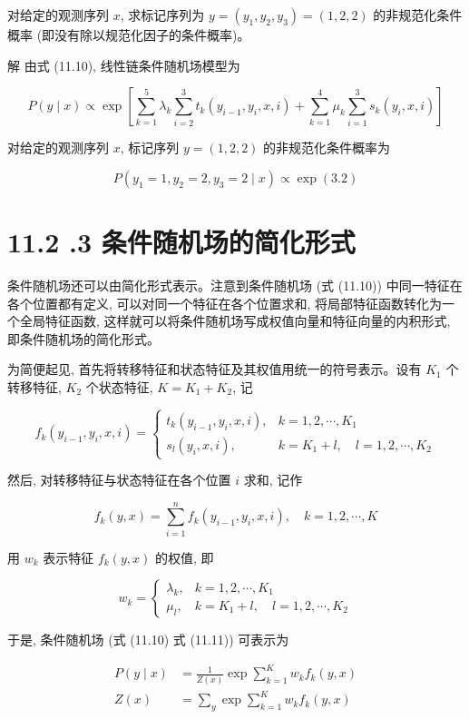 \documentclass[10pt]{article}
\begin{document}
\begin{CJK*}{UTF8}{bsmi}
对给定的观测序列 $x$, 求标记序列为 $y=\left(y_{1}, y_{2}, y_{3}\right)=(1,2,2)$ 的非规范化条件概率 (即没有除以规范化因子的条件概率)。

解 由式 (11.10), 线性链条件随机场模型为

$$
P(y \mid x) \propto \exp \left[\sum_{k=1}^{5} \lambda_{k} \sum_{i=2}^{3} t_{k}\left(y_{i-1}, y_{i}, x, i\right)+\sum_{k=1}^{4} \mu_{k} \sum_{i=1}^{3} s_{k}\left(y_{i}, x, i\right)\right]
$$

对给定的观测序列 $x$, 标记序列 $y=(1,2,2)$ 的非规范化条件概率为

$$
P\left(y_{1}=1, y_{2}=2, y_{3}=2 \mid x\right) \propto \exp (3.2)
$$

\section*{11.2 .3 条件随机场的简化形式}
条件随机场还可以由简化形式表示。注意到条件随机场 (式 (11.10)) 中同一特征在各个位置都有定义, 可以对同一个特征在各个位置求和, 将局部特征函数转化为一个全局特征函数, 这样就可以将条件随机场写成权值向量和特征向量的内积形式, 即条件随机场的简化形式。

为简便起见, 首先将转移特征和状态特征及其权值用统一的符号表示。设有 $K_{1}$ 个转移特征, $K_{2}$ 个状态特征, $K=K_{1}+K_{2}$, 记

\[
f_{k}\left(y_{i-1}, y_{i}, x, i\right)= \begin{cases}t_{k}\left(y_{i-1}, y_{i}, x, i\right), & k=1,2, \cdots, K_{1}  \tag{11.12}\\ s_{l}\left(y_{i}, x, i\right), & k=K_{1}+l, \quad l=1,2, \cdots, K_{2}\end{cases}
\]

然后, 对转移特征与状态特征在各个位置 $i$ 求和, 记作


\begin{equation*}
f_{k}(y, x)=\sum_{i=1}^{n} f_{k}\left(y_{i-1}, y_{i}, x, i\right), \quad k=1,2, \cdots, K \tag{11.13}
\end{equation*}


用 $w_{k}$ 表示特征 $f_{k}(y, x)$ 的权值, 即

\[
w_{k}= \begin{cases}\lambda_{k}, & k=1,2, \cdots, K_{1}  \tag{11.14}\\ \mu_{l}, & k=K_{1}+l, \quad l=1,2, \cdots, K_{2}\end{cases}
\]

于是, 条件随机场 (式 (11.10) 式 (11.11)) 可表示为


\begin{align*}
P(y \mid x) & =\frac{1}{Z(x)} \exp \sum_{k=1}^{K} w_{k} f_{k}(y, x)  \tag{11.15}\\
Z(x) & =\sum_{y} \exp \sum_{k=1}^{K} w_{k} f_{k}(y, x) \tag{11.16}
\end{align*}



\end{CJK*}
\end{document}
